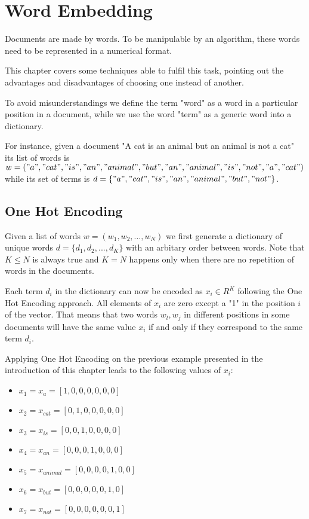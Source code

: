 \chapter{Word Embedding} \label{wordemb}
Documents are made by words.
To be manipulable by an algorithm, these words need to be represented in a numerical format.

This chapter covers some techniques able to fulfil this task,
pointing out the advantages and disadvantages of choosing one instead of another.

To avoid misunderstandings
we define the term "word" as a word in a particular position in a document,
while we use the word "term" as a generic word into a dictionary.

For instance, given a document "A cat is an animal but an animal is not a cat" its list of words
is $ w = ("a", "cat", "is", "an", "animal", "but", "an", "animal", "is", "not", "a", "cat")$
while its set of terms is $d = \{"a", "cat", "is", "an", "animal", "but", "not"\}$.

\section{One Hot Encoding}
Given a list of words $w = (w_1, w_2, \dots, w_N)$
we first generate a dictionary of unique words
$d = \{d_1, d_2, ..., d_K\}$ with an arbitary order between words.
Note that $ K \leq N $ is always true and $ K = N $ happens only when there are no repetition of words in the documents.

Each term $d_i$ in the dictionary can now be encoded as $x_i \in R^K$ following the One Hot Encoding approach.
All elements of $x_i$ are zero except a "1" in the position  $i$ of the vector.
That means that two words $w_l, w_j$ in different positions in some documents will have the same value $x_i$ if and only if they correspond to the same term $d_i$.

Applying One Hot Encoding on the previous example presented in the introduction of this chapter leads to the following values of $x_i$:
\begin{multicols}{2}
    \begin{itemize}
        \item $x_1 = x_{a} = [1, 0, 0, 0, 0, 0, 0]$
        \item $x_2 = x_{cat} = [0, 1, 0, 0, 0, 0, 0]$
        \item $x_3 = x_{is} = [0, 0, 1, 0, 0, 0, 0]$
        \item $x_4 = x_{an} = [0, 0, 0, 1, 0, 0, 0]$
        \item $x_5 = x_{animal} = [0, 0, 0, 0, 1, 0, 0]$
        \item $x_6 = x_{but} = [0, 0, 0, 0, 0, 1, 0]$
        \item $x_7 = x_{not} = [0, 0, 0, 0, 0, 0, 1]$
    \end{itemize}
\end{multicols}

